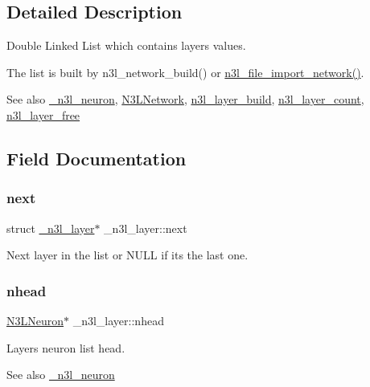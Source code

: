 \subsection{Detailed Description}
Double Linked List which contains layer\textquotesingle{}s values. 

The list is built by n3l\+\_\+network\+\_\+build() or \hyperlink{n3__file_8c_a4fef76548ed87845dceafaa9527a83d0}{n3l\+\_\+file\+\_\+import\+\_\+network()}.

\begin{DoxySeeAlso}{See also}
\hyperlink{struct__n3l__neuron}{\+\_\+n3l\+\_\+neuron}, \hyperlink{structN3LNetwork}{N3\+L\+Network}, \hyperlink{n3__layer_8c_a135215adb7cf8420293fd4ebd7049655}{n3l\+\_\+layer\+\_\+build}, \hyperlink{n3__layer_8c_ab06afb58d55be21a00bde5ee840f6425}{n3l\+\_\+layer\+\_\+count}, \hyperlink{n3__layer_8c_ad58e1630c1b7fc5da03d54cf63c394d9}{n3l\+\_\+layer\+\_\+free} 
\end{DoxySeeAlso}


\subsection{Field Documentation}
\mbox{\label{struct__n3l__layer_afada0fe8b2a403d5aeeb71b0ae7f8aae}} 
\subsubsection{\texorpdfstring{next}{next}}
{\footnotesize\ttfamily struct \hyperlink{struct__n3l__layer}{\+\_\+n3l\+\_\+layer}$\ast$ \+\_\+n3l\+\_\+layer\+::next}

Next layer in the list or N\+U\+LL if it\textquotesingle{}s the last one. \mbox{\label{struct__n3l__layer_a263e7831428a3b535964412a1d802c4e}} 
\subsubsection{\texorpdfstring{nhead}{nhead}}
{\footnotesize\ttfamily \hyperlink{n3__header_8h_a621b1df037f351bd3542298933e5799a}{N3\+L\+Neuron}$\ast$ \+\_\+n3l\+\_\+layer\+::nhead}

Layer\textquotesingle{}s neuron list head. \begin{DoxySeeAlso}{See also}
\hyperlink{struct__n3l__neuron}{\+\_\+n3l\+\_\+neuron} 
\end{DoxySeeAlso}
\mbox{\label{struct__n3l__layer_aa120fe4ab0898e733b8d6940b467ebc3}} 
